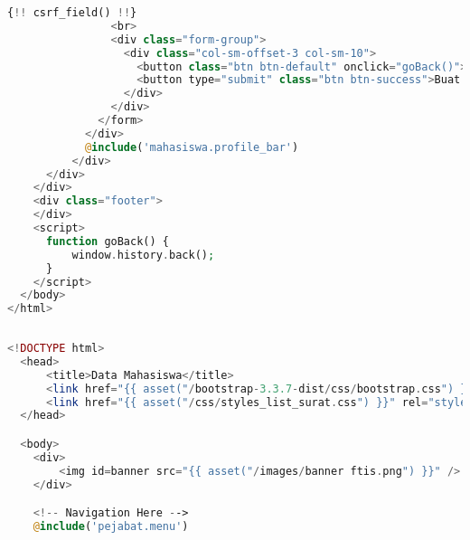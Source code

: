 \begin{lstlisting}[language=php,basicstyle=\tiny,caption=\textit{Preview} isi persetujuan dan catatan]
                {!! csrf_field() !!}
                <br>
                <div class="form-group">
                  <div class="col-sm-offset-3 col-sm-10">
                    <button class="btn btn-default" onclick="goBack()">Kembali</button>
                    <button type="submit" class="btn btn-success">Buat Surat</button>
                  </div>
                </div>
              </form>
            </div>
            @include('mahasiswa.profile_bar')
          </div>
      </div>
    </div>
    <div class="footer">
    </div>
    <script>
      function goBack() {
          window.history.back();
      }
    </script>
  </body>
</html>
	
\end{lstlisting}

\begin{lstlisting}[language=php,basicstyle=\tiny,caption=\textit{History} pejabat]
	<!DOCTYPE html>
  <head>
      <title>Data Mahasiswa</title>
      <link href="{{ asset("/bootstrap-3.3.7-dist/css/bootstrap.css") }}" rel="stylesheet" type="text/css" />
      <link href="{{ asset("/css/styles_list_surat.css") }}" rel="stylesheet" type="text/css">
  </head>

  <body>
    <div>
        <img id=banner src="{{ asset("/images/banner ftis.png") }}" />
    </div>

    <!-- Navigation Here -->
    @include('pejabat.menu')


\end{lstlisting}
